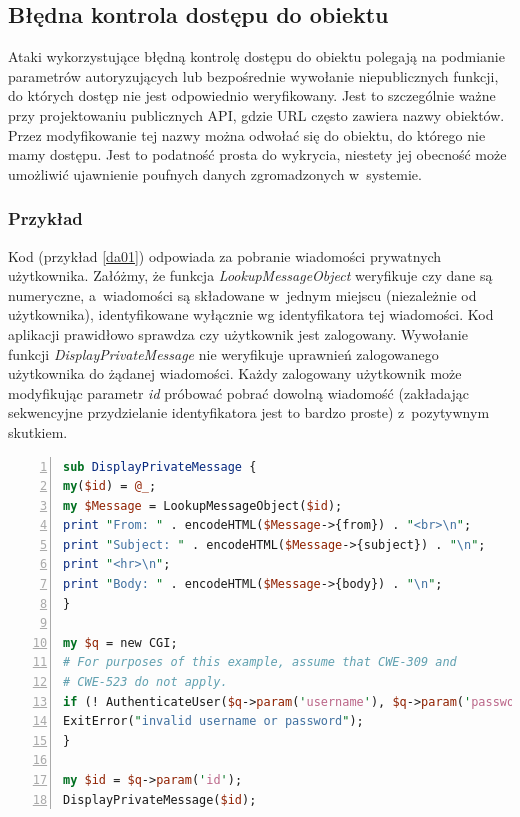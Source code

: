 \documentclass[12pt,a4paper,polish,thesis]{dcsbook}
\begin{document}
\subsection{Błędna kontrola dostępu do obiektu}
Ataki wykorzystujące błędną kontrolę dostępu do obiektu polegają na podmianie parametrów autoryzujących lub bezpośrednie wywołanie niepublicznych funkcji, do których dostęp nie jest odpowiednio weryfikowany. Jest to szczególnie ważne przy projektowaniu publicznych API, gdzie URL często zawiera nazwy obiektów. Przez modyfikowanie tej nazwy można odwołać się do obiektu, do którego nie mamy dostępu. Jest to podatność prosta do wykrycia, niestety jej obecność może umożliwić ujawnienie poufnych danych zgromadzonych w~systemie.

\subsubsection*{Przykład}
Kod (przykład \ref{da01}) odpowiada za pobranie wiadomości prywatnych użytkownika. Załóżmy, że funkcja \textit{LookupMessageObject} weryfikuje czy dane są numeryczne, a~wiadomości są składowane w~jednym miejscu (niezależnie od użytkownika), identyfikowane wyłącznie wg identyfikatora tej wiadomości. Kod aplikacji prawidłowo sprawdza czy użytkownik jest zalogowany. Wywołanie funkcji \textit{DisplayPrivateMessage} nie weryfikuje uprawnień zalogowanego użytkownika do żądanej wiadomości. Każdy zalogowany użytkownik może modyfikując parametr \textit{id} próbować pobrać dowolną wiadomość (zakładając sekwencyjne przydzielanie identyfikatora jest to bardzo proste) z~pozytywnym skutkiem.

\begin{lstlisting}[language=perl,frame=single,caption=przykładowy kod podatny na bezpośrednie odwołanie \cite{directaccess},label=da01,numbers=left]
sub DisplayPrivateMessage {
my($id) = @_;
my $Message = LookupMessageObject($id);
print "From: " . encodeHTML($Message->{from}) . "<br>\n";
print "Subject: " . encodeHTML($Message->{subject}) . "\n";
print "<hr>\n";
print "Body: " . encodeHTML($Message->{body}) . "\n";
}

my $q = new CGI;
# For purposes of this example, assume that CWE-309 and
# CWE-523 do not apply.
if (! AuthenticateUser($q->param('username'), $q->param('password'))) {
ExitError("invalid username or password");
}

my $id = $q->param('id');
DisplayPrivateMessage($id);
\end{lstlisting}
\end{document}
